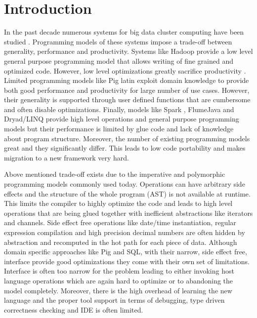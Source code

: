 \section{Introduction}
\label{sec:introduction}

In the past decade numerous systems for big data cluster computing have been studied \cite{dean_mapreduce:_2008, yu_dryadlinq:_2008-1, olston_pig_2008-1, thusoo_hive_2010-1, zaharia_spark:_2010}. Programming models of these systems impose a trade-off between generality, performance and productivity. Systems like Hadoop \cite{_hadoop_????} provide a low level general purpose programming model that allows writing of fine grained and optimized code.  However, low level optimizations greatly sacrifice productivity \cite{chambers_flumejava:_2010}. Limited programming models like Pig latin \cite{olston_pig_2008-1} exploit domain knowledge to provide both good performance and productivity for large number of use cases. However, their generality is supported through user defined functions that are cumbersome and often disable optimizations. Finally, models like Spark \cite{zaharia_spark:_2010}, FlumeJava \cite{chambers_flumejava:_2010} and Dryad/LINQ \cite{yu_dryadlinq:_2008-1} provide high level operations and general purpose programming models but their performance is limited by glue code and lack of knowledge about program structure. Moreover, the number of existing programming models great and they significantly differ. This leads to low code portability and makes migration to a new framework very hard. 

Above mentioned trade-off exists due to the imperative and polymorphic programming models commonly used today. Operations can have arbitrary side effects and the structure of the whole program (AST) is not available at runtime. This limits the compiler to highly optimize the code and leads to high level operations that are being glued together with inefficient abstractions like iterators and channels. Side effect free operations like date/time instantiation, regular expression compilation and high precision decimal numbers are often hidden by abstraction and recomputed in the hot path for each piece of data. Although domain specific approaches like Pig and SQL, with their narrow, side effect free, interface provide good optimizations they come with their own set of limitations. Interface is often too narrow for the problem leading to either invoking host language operations which are again hard to optimize or to abandoning the model completely. Moreover, there is the high overhead of learning the new language and the proper tool support in terms of debugging, type driven correctness checking and IDE is often limited.     

